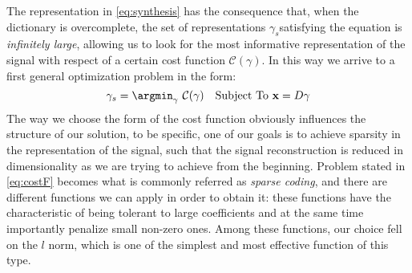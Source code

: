 The representation in \autoref{eq:synthesis} has the consequence that, when the dictionary is overcomplete, the set of representations $\gamma_s$satisfying the equation is \textit{infinitely large}, allowing us to look for the most informative representation of the signal with respect of a certain cost function $\mathcal{C}(\gamma)$. In this way we arrive to a first general optimization problem in the form:
\begin{equation}
\gamma_s = \argmin_{\gamma} \text{  } \mathcal{C}(\gamma) \quad \text{Subject To  } \textbf{x} = \textbf{$D\gamma$}
\label{eq:costF}
\end{equation}
The way we choose the form of the cost function obviously influences the structure of our solution, to be specific, one of our goals is to achieve sparsity in the representation of the signal, such that the signal reconstruction is reduced in dimensionality as we are trying to achieve from the beginning. Problem stated in \autoref{eq:costF} becomes what is commonly referred as \textit{sparse coding}, and there are different functions we can apply in order to obtain it: these functions have the characteristic of being tolerant to large coefficients and at the same time importantly penalize small non-zero ones. Among these functions, our choice fell on the $l$ norm, which is one of the simplest and most effective function of this type.


